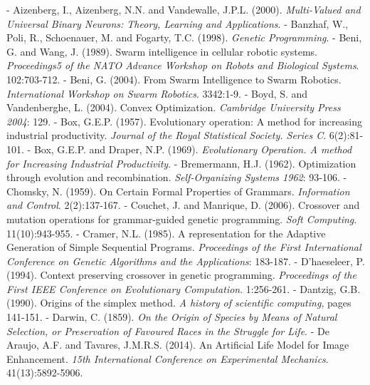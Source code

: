 \documentclass[spanish,a4paper,12pt,twoside]{report}
\begin{document}
  \begin{thebibliography}{00}
  \vspace{-1cm}
  \makeatletter
  \def\@biblabel#1{}
  \let\old@bibitem\bibitem
  \def\bibitem#1{\old@bibitem{#1}\leavevmode\kern-\bibindent}
  \makeatother
  
   Aizenberg, I., Aizenberg, N.N. and Vandewalle, J.P.L. (2000). \emph{Multi-Valued and Universal Binary Neurons: Theory, Learning and Applications}.
   Banzhaf, W., Poli, R., Schoenauer, M. and Fogarty, T.C. (1998). \emph{Genetic Programming}.
   Beni, G. and Wang, J. (1989). Swarm intelligence in cellular robotic systems. \emph{Proceedings5 of the NATO Advance Workshop on Robots and Biological Systems}. 102:703-712.
   Beni, G. (2004). From Swarm Intelligence to Swarm Robotics. \emph{International Workshop on Swarm Robotics}. 3342:1-9.
   Boyd, S. and Vandenberghe, L. (2004). Convex Optimization. \emph{Cambridge University Press 2004}: 129.
   Box, G.E.P. (1957). Evolutionary operation: A method for increasing industrial productivity. \emph{Journal of the Royal Statistical Society. Series C}. 6(2):81-101.
   Box, G.E.P. and Draper, N.P. (1969). \emph{Evolutionary Operation. A method for Increasing Industrial Productivity}.
   Bremermann, H.J. (1962). Optimization through evolution and recombination. \emph{Self-Organizing Systems 1962}: 93-106.
   Chomsky, N. (1959). On Certain Formal Properties of Grammars. \emph{Information and Control}. 2(2):137-167.
   Couchet, J. and Manrique, D. (2006). Crossover and mutation operations for grammar-guided genetic programming. \emph{Soft Computing}. 11(10):943-955.
   Cramer, N.L. (1985). A representation for the Adaptive Generation of Simple Sequential Programs. \emph{Proceedings of the First International Conference on Genetic Algorithms and the Applications}: 183-187.
   D'haeseleer, P. (1994). Context preserving crossover in genetic programming. \emph{Proceedings of the First IEEE Conference on Evolutionary Computation}. 1:256-261.
   Dantzig, G.B. (1990). Origins of the simplex method. \emph{A history of scientific computing}, pages 141-151.
   Darwin, C. (1859). \emph{On the Origin of Species by Means of Natural Selection, or Preservation of Favoured Races in the Struggle for Life}. 
   De Araujo, A.F. and Tavares, J.M.R.S. (2014). An Artificial Life Model for Image Enhancement. \emph{15th International Conference on Experimental Mechanics}. 41(13):5892-5906.

\end{thebibliography}
\end{document}
